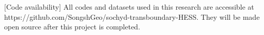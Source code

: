 \documentclass{article}
\begin{document}
[Code availability] All codes and datasets used in this research are accessible at https://github.com/SongshGeo/sochyd-transboundary-HESS. They will be made open source after this project is completed.




\end{document}
